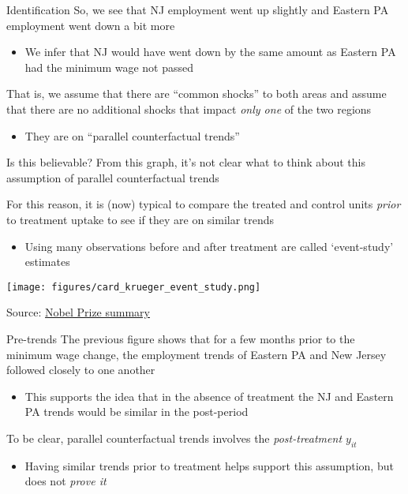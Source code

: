 \documentclass[aspectratio=169,t,11pt,table]{beamer}
\begin{document}

\begin{frame}{Identification}
  So, we see that NJ employment went up slightly and Eastern PA employment went down a bit more
  \begin{itemize}
    \item We infer that NJ would have went down by the same amount as Eastern PA had the minimum wage not passed 
  \end{itemize}

  \bigskip
  That is, we assume that there are ``common shocks'' to both areas and assume that there are no additional shocks that impact \emph{only one} of the two regions
  \begin{itemize}
    \item They are on ``parallel counterfactual trends''
  \end{itemize}
\end{frame}


\begin{frame}{Is this believable?}
  From this graph, it's not clear what to think about this assumption of parallel counterfactual trends

  \bigskip
  For this reason, it is (now) typical to compare the treated and control units \emph{prior} to treatment uptake to see if they are on similar trends
  \begin{itemize}
    \item Using many observations before and after treatment are called `event-study' estimates
  \end{itemize}
\end{frame}

\begin{frame}{}
  \begin{center}
    \texttt{[image: figures/card\_krueger\_event\_study.png]}
    
    Source: \href{https://www.nobelprize.org/uploads/2021/10/fig3_ek_en_21_effectIncreasingMinimunWage.pdf}{Nobel Prize summary} 
  \end{center}
\end{frame}

\begin{frame}{Pre-trends}
  The previous figure shows that for a few months prior to the minimum wage change, the employment trends of Eastern PA and New Jersey followed closely to one another
  \begin{itemize}
    \item This supports the idea that in the absence of treatment the NJ and Eastern PA trends would be similar in the post-period
  \end{itemize}

  \pause
  \bigskip
  To be clear, parallel counterfactual trends involves the \emph{post-treatment $y_{it}$}
  \begin{itemize}
    \item Having similar trends prior to treatment helps support this assumption, but does not \emph{prove it}
  \end{itemize}
\end{frame}
\end{document}
